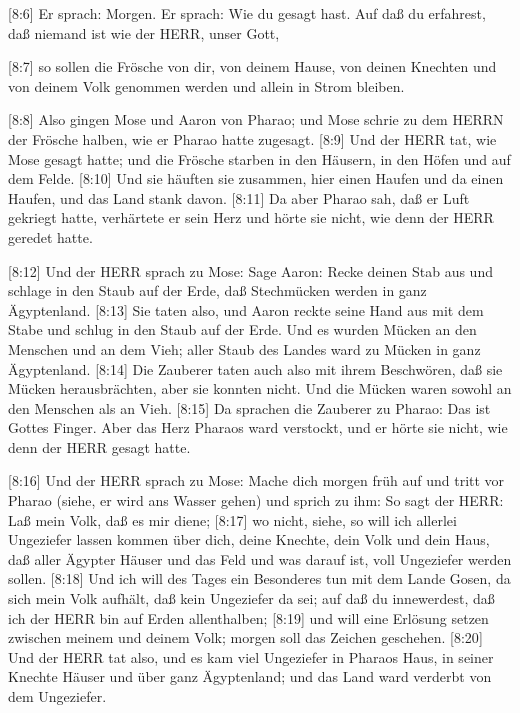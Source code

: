  {[}8:6{]} Er sprach: Morgen. Er sprach: Wie du gesagt
hast. Auf daß du erfahrest, daß niemand ist wie der HERR, unser Gott,

 {[}8:7{]} so sollen die Frösche von dir, von deinem Hause,
von deinen Knechten und von deinem Volk genommen werden und allein in
Strom bleiben.

 {[}8:8{]} Also gingen Mose und Aaron von Pharao; und Mose
schrie zu dem HERRN der Frösche halben, wie er Pharao hatte zugesagt.
 {[}8:9{]} Und der HERR tat, wie Mose gesagt hatte; und die
Frösche starben in den Häusern, in den Höfen und auf dem Felde.
 {[}8:10{]} Und sie häuften sie zusammen, hier einen Haufen
und da einen Haufen, und das Land stank davon.  {[}8:11{]}
Da aber Pharao sah, daß er Luft gekriegt hatte, verhärtete er sein Herz
und hörte sie nicht, wie denn der HERR geredet hatte.

 {[}8:12{]} Und der HERR sprach zu Mose: Sage Aaron: Recke
deinen Stab aus und schlage in den Staub auf der Erde, daß Stechmücken
werden in ganz Ägyptenland.  {[}8:13{]} Sie taten also, und
Aaron reckte seine Hand aus mit dem Stabe und schlug in den Staub auf
der Erde. Und es wurden Mücken an den Menschen und an dem Vieh; aller
Staub des Landes ward zu Mücken in ganz Ägyptenland. 
{[}8:14{]} Die Zauberer taten auch also mit ihrem Beschwören, daß sie
Mücken herausbrächten, aber sie konnten nicht. Und die Mücken waren
sowohl an den Menschen als an Vieh.  {[}8:15{]} Da sprachen
die Zauberer zu Pharao: Das ist Gottes Finger. Aber das Herz Pharaos
ward verstockt, und er hörte sie nicht, wie denn der HERR gesagt hatte.

 {[}8:16{]} Und der HERR sprach zu Mose: Mache dich morgen
früh auf und tritt vor Pharao (siehe, er wird ans Wasser gehen) und
sprich zu ihm: So sagt der HERR: Laß mein Volk, daß es mir diene;
 {[}8:17{]} wo nicht, siehe, so will ich allerlei
Ungeziefer lassen kommen über dich, deine Knechte, dein Volk und dein
Haus, daß aller Ägypter Häuser und das Feld und was darauf ist, voll
Ungeziefer werden sollen.  {[}8:18{]} Und ich will des
Tages ein Besonderes tun mit dem Lande Gosen, da sich mein Volk aufhält,
daß kein Ungeziefer da sei; auf daß du innewerdest, daß ich der HERR bin
auf Erden allenthalben;  {[}8:19{]} und will eine Erlösung
setzen zwischen meinem und deinem Volk; morgen soll das Zeichen
geschehen.  {[}8:20{]} Und der HERR tat also, und es kam
viel Ungeziefer in Pharaos Haus, in seiner Knechte Häuser und über ganz
Ägyptenland; und das Land ward verderbt von dem Ungeziefer.

